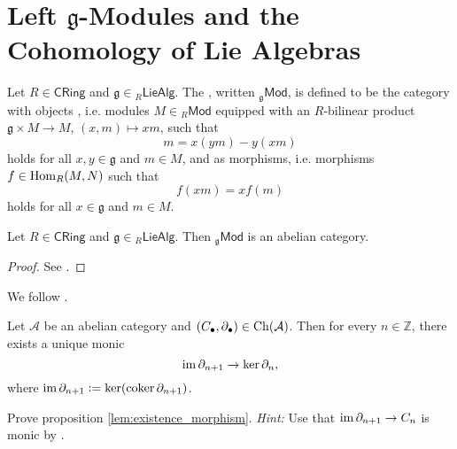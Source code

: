 \section*{Left $\mathfrak{g}$-Modules and the Cohomology of Lie Algebras}

\begin{definition}
	Let $R \in \mathsf{CRing}$ and $\mathfrak{g} \in {_{R}\mathsf{LieAlg}}$. The , written $_{\mathfrak{g}}\mathsf{Mod}$, is defined to be the category with objects , i.e. modules $M \in {_{R}}\mathsf{Mod}$ equipped with an $R$-bilinear product $\mathfrak{g} \times M \to M$, $(x,m) \mapsto xm$, such that 
	\begin{equation*}
		[x,y]m = x(ym) - y(xm)
	\end{equation*}
	\noindent holds for all $x,y \in \mathfrak{g}$ and $m \in M$, and  as morphisms, i.e. morphisms $f \in \operatorname{Hom}_R(M,N)$ such that 
	\begin{equation*}
		f(xm) = xf(m)
	\end{equation*}
	\noindent holds for all $x \in \mathfrak{g}$ and $m \in M$.
\end{definition}

\begin{proposition}
	Let $R \in \mathsf{CRing}$ and $\mathfrak{g} \in {_{R}\mathsf{LieAlg}}$. Then $_{\mathfrak{g}}\mathsf{Mod}$ is an abelian category.
\end{proposition}

\begin{proof}
	See \cite[220]{weibel:homological_algebra:1994}.
\end{proof}

We follow \cite[178]{kashiwara:categories:2006}.

\begin{proposition}
	\label{lem:existence_morphism}
	Let $\mathcal{A}$ be an abelian category and $(C_\bullet,\partial_\bullet) \in \operatorname{Ch}(\mathcal{A})$. Then for every $n \in \mathbb{Z}$, there exists a unique monic 
	\begin{equation*}
		\operatorname{im} \partial_{n + 1} \to \ker \partial_n,
	\end{equation*}
	\noindent where $\operatorname{im} \partial_{n + 1} := \ker(\operatorname{coker} \partial_{n + 1})$.
\end{proposition}

\begin{exercise}
	Prove proposition \ref{lem:existence_morphism}. \emph{Hint:} Use that $\operatorname{im} \partial_{n + 1} \to C_n$ is monic by \cite[199]{maclane:categories:1978}.
\end{exercise}

